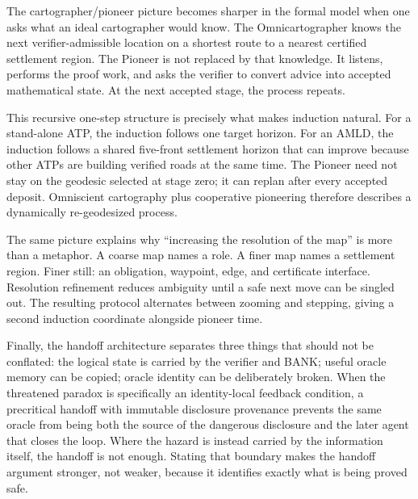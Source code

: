 \documentclass[11pt]{article}
\theoremstyle{remark}
\begin{document}
The cartographer/pioneer picture becomes sharper in the formal model when one asks what an ideal cartographer would know. The Omnicartographer knows the next verifier-admissible location on a shortest route to a nearest certified settlement region. The Pioneer is not replaced by that knowledge. It listens, performs the proof work, and asks the verifier to convert advice into accepted mathematical state. At the next accepted stage, the process repeats.

This recursive one-step structure is precisely what makes induction natural. For a stand-alone ATP, the induction follows one target horizon. For an AMLD, the induction follows a shared five-front settlement horizon that can improve because other ATPs are building verified roads at the same time. The Pioneer need not stay on the geodesic selected at stage zero; it can replan after every accepted deposit. Omniscient cartography plus cooperative pioneering therefore describes a dynamically re-geodesized process.

The same picture explains why ``increasing the resolution of the map'' is more than a metaphor. A coarse map names a role. A finer map names a settlement region. Finer still: an obligation, waypoint, edge, and certificate interface. Resolution refinement reduces ambiguity until a safe next move can be singled out. The resulting protocol alternates between zooming and stepping, giving a second induction coordinate alongside pioneer time.

Finally, the handoff architecture separates three things that should not be conflated: the logical state is carried by the verifier and BANK; useful oracle memory can be copied; oracle identity can be deliberately broken. When the threatened paradox is specifically an identity-local feedback condition, a precritical handoff with immutable disclosure provenance prevents the same oracle from being both the source of the dangerous disclosure and the later agent that closes the loop. Where the hazard is instead carried by the information itself, the handoff is not enough. Stating that boundary makes the handoff argument stronger, not weaker, because it identifies exactly what is being proved safe.
\end{document}
